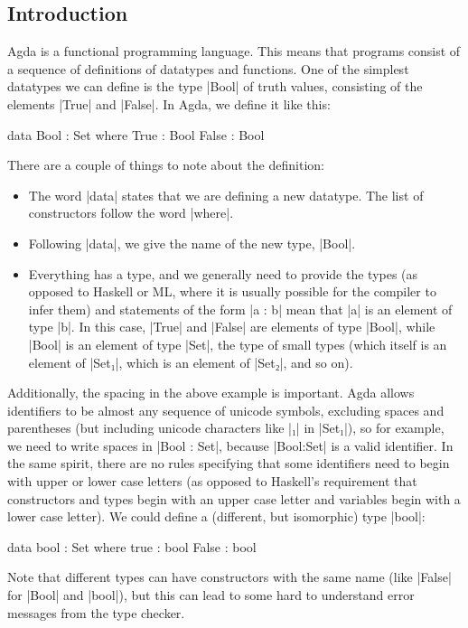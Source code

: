 \subsection{Introduction}
Agda is a functional programming language. This means that programs consist of a sequence of definitions of datatypes and functions. One of the simplest datatypes we can define is the type |Bool| of truth values, consisting of the elements |True| and |False|. In Agda, we define it like this:
\begin{code}
data Bool : Set where
  True   : Bool
  False  : Bool
\end{code}
There are a couple of things to note about the definition:
\begin{itemize}
\item The word |data| states that we are defining a new datatype. The list of constructors follow the word |where|. 
\item Following |data|, we give the name of the new type, |Bool|.
\item Everything has a type, and we generally need to provide the types (as opposed to Haskell or ML, where it is usually possible for the compiler to infer them) and statements of the form |a : b| mean that |a| is an element of type |b|. In this case, |True| and |False| are elements of type |Bool|, while |Bool| is an element of type |Set|, the type of small types (which itself is an element of |Set₁|, which is an element of |Set₂|, and so on).
\end{itemize}
Additionally, the spacing in the above example is important. Agda allows identifiers to be almost any sequence of unicode symbols, excluding spaces and parentheses (but including unicode characters like |₁| in |Set₁|), so for example, we need to write spaces in |Bool : Set|, because |Bool:Set| is a valid identifier. In the same spirit, there are no rules specifying that some identifiers need to begin with upper or lower case letters (as opposed to Haskell's requirement that constructors and types begin with an upper case letter and variables begin with a lower case letter). We could define a (different, but isomorphic) type |bool|:
\begin{code}
data bool : Set where
  true  : bool
  False : bool
\end{code}
Note that different types can have constructors with the same name (like |False| for |Bool| and |bool|), but this can lead to some hard to understand error messages from the type checker.

